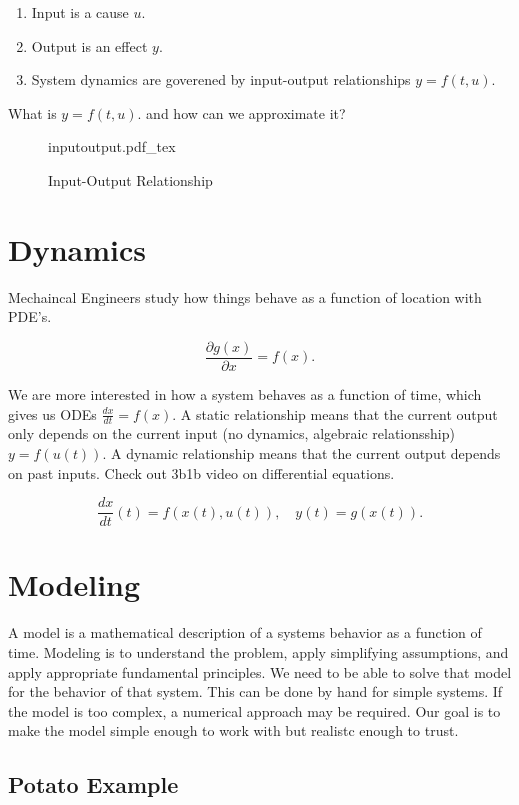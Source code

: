 \documentclass[12pt, a4paper]{report}
\newcommand{\incfig}[2][1]{%
    \def\svgwidth{#1\columnwidth}
    {#2.pdf_tex}
}
\begin{document}
  \begin{enumerate}
    \item Input is a cause $ u. $
    \item Output is an effect $ y. $
    \item System dynamics are goverened by input-output relationships $ y = f(t, u). $
  \end{enumerate}

  What is $ y = f(t, u). $ and how can we approximate it?

  \begin{figure}
    \centering
    \incfig{inputoutput}
    \caption{Input-Output Relationship}
  \end{figure}

  \section{Dynamics}

  Mechaincal Engineers study how things behave as a function of location with PDE's.

  \[
      \frac{\partial g(x)}{\partial x} = f(x)
    .\]

  We are more interested in how a system behaves as a function of time, which gives us ODEs $ \frac{dx}{dt} = f(x). $ A static relationship means that the current output only depends on the current input (no dynamics, algebraic relationsship) $ y = f(u(t)). $ A dynamic relationship means that the current output depends on past inputs. Check out 3b1b video on differential equations.

  \[
      \frac{dx}{dt}(t) = f(x(t), u(t)), \quad y(t) = g(x(t))
    .\]

  \section{Modeling}

  A model is a mathematical description of a systems behavior as a function of time. Modeling is to understand the problem, apply simplifying assumptions, and apply appropriate fundamental principles. We need to be able to solve that model for the behavior of that system. This can be done by hand for simple systems. If the model is too complex, a numerical approach may be required. Our goal is to make the model simple enough to work with but realistc enough to trust.

  \newpage

  \subsection{Potato Example}
\end{document}
